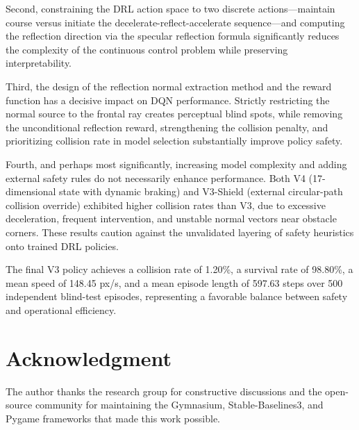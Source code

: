 \documentclass[conference]{IEEEtran}
\begin{document}
Second, constraining the DRL action space to two discrete actions---maintain course versus initiate the decelerate-reflect-accelerate sequence---and computing the reflection direction via the specular reflection formula significantly reduces the complexity of the continuous control problem while preserving interpretability.

Third, the design of the reflection normal extraction method and the reward function has a decisive impact on DQN performance. Strictly restricting the normal source to the frontal ray creates perceptual blind spots, while removing the unconditional reflection reward, strengthening the collision penalty, and prioritizing collision rate in model selection substantially improve policy safety.

Fourth, and perhaps most significantly, increasing model complexity and adding external safety rules do not necessarily enhance performance. Both V4 (17-dimensional state with dynamic braking) and V3-Shield (external circular-path collision override) exhibited higher collision rates than V3, due to excessive deceleration, frequent intervention, and unstable normal vectors near obstacle corners. These results caution against the unvalidated layering of safety heuristics onto trained DRL policies.

The final V3 policy achieves a collision rate of 1.20\%, a survival rate of 98.80\%, a mean speed of 148.45 px/s, and a mean episode length of 597.63 steps over 500 independent blind-test episodes, representing a favorable balance between safety and operational efficiency.

\section*{Acknowledgment}
The author thanks the research group for constructive discussions and the open-source community for maintaining the Gymnasium, Stable-Baselines3, and Pygame frameworks that made this work possible.
\end{document}
